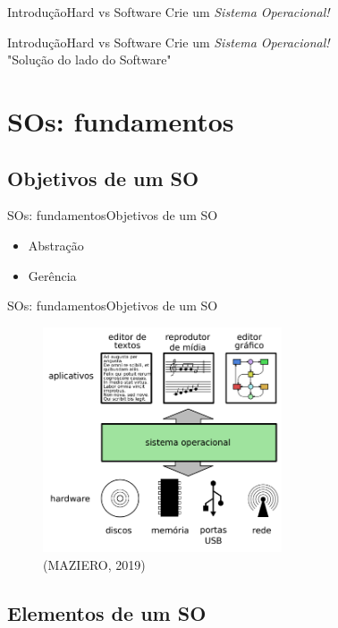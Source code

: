 \documentclass{beamer}
\begin{document}
      \begin{frame}{Introdução}{Hard vs Software}
        Crie um \emph{Sistema Operacional!}
      \end{frame}

      \begin{frame}{Introdução}{Hard vs Software}
        Crie um \emph{Sistema Operacional!}\\
        "Solução do lado do Software"
      \end{frame}

  \section{SOs: fundamentos}
    \subsection{Objetivos de um SO}

      \begin{frame}{SOs: fundamentos}{Objetivos de um SO}
        \begin{itemize}
        \item Abstração
        \item Gerência
        \end{itemize}
      \end{frame}

      \begin{frame}{SOs: fundamentos}{Objetivos de um SO}
        \begin{figure}[!htb]
          \centering
          \includegraphics[width=200pt, keepaspectratio=true]{figuras/fundamentos/SOComoUmaInterface.png}
          \caption{(MAZIERO, 2019)}
          \label{SOComoUmaInterface}
        \end{figure}
      \end{frame}

    \subsection{Elementos de um SO}
\end{document}
